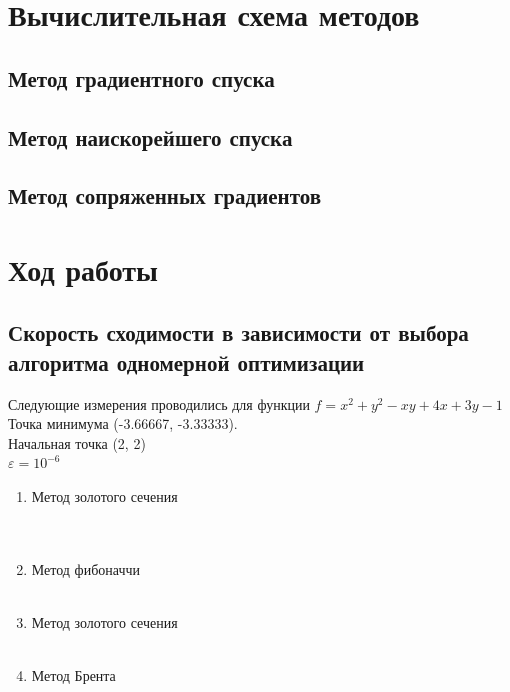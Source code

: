 \section{Вычислительная схема методов}

\subsection{Метод градиентного спуска}
\subsection{Метод наискорейшего спуска}
\subsection{Метод сопряженных градиентов}

\section{Ход работы}

\subsection{Скорость сходимости в зависимости от выбора алгоритма одномерной оптимизации}

Следующие измерения проводились для функции
\(f = x^2 + y^2 - xy + 4x + 3y - 1\)  \\
Точка минимума (-3.66667, -3.33333). \\
Начальная точка (2, 2) \\
$\varepsilon = 10^{-6}$ \\


\begin{enumerate}
	\item Метод золотого сечения \\
	      \\
	       \\
	\item Метод фибоначчи \\
	      \\
	\item Метод золотого сечения \\
	      \\
	\item Метод Брента \\
	      \\
\end{enumerate}

